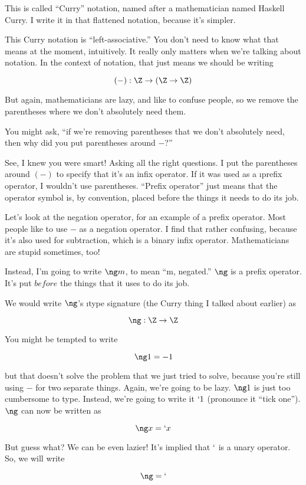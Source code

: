 This is called ``Curry'' notation, named after a mathematician named Haskell
Curry. I write it in that flattened notation, because it's simpler. 

This Curry notation is ``left-associative.'' You don't need to know what that
means at the moment, intuitively. It really only matters when we're talking
about notation.  In the context of notation, that just means we should be
writing

\[ (-) : \Z \to (\Z \to \Z) \]

But again, mathematicians are lazy, and like to confuse people, so we remove the
parentheses where we don't absolutely need them.

You might ask, ``if we're removing parentheses that we don't absolutely need,
then why did you put parentheses around $-$?'' 

See, I knew you were smart! Asking all the right questions. I put the
parentheses around $(-)$ to specify that it's an infix operator. If it was used
as a \i{prefix} operator, I wouldn't use parentheses. ``Prefix operator'' just
means that the operator symbol is, by convention, placed before the things it
needs to do its job.

Let's look at the negation operator, for an example of a prefix operator. Most
people like to use $-$  as a negation operator. I find that rather confusing,
because it's also used for subtraction, which is a binary infix
operator. Mathematicians are stupid sometimes, too!

Instead, I'm going to write $\ng m$, to mean ``m, negated.'' $\ng$ is a prefix
operator. It's put $before$ the things that it uses to do its job.

We would write $\ng$'s \i{type signature} (the Curry thing I talked about
earlier) as 

\[ \ng : \Z \to \Z \]

You might be tempted to write 

\[ \ng 1 = -1 \]

but that doesn't solve the problem that we just tried to solve, because you're
still using $-$ for two separate things. Again, we're going to be lazy. $\ng 1$
is just too cumbersome to type. Instead, we're going to write it $` 1$
(pronounce it ``tick one'').  $\ng$ can now be written as

\[ \ng x = ` x \]

But guess what? We can be even lazier! It's implied that $`$ is a unary
operator. So, we will write

\[ \ng = ` \]


